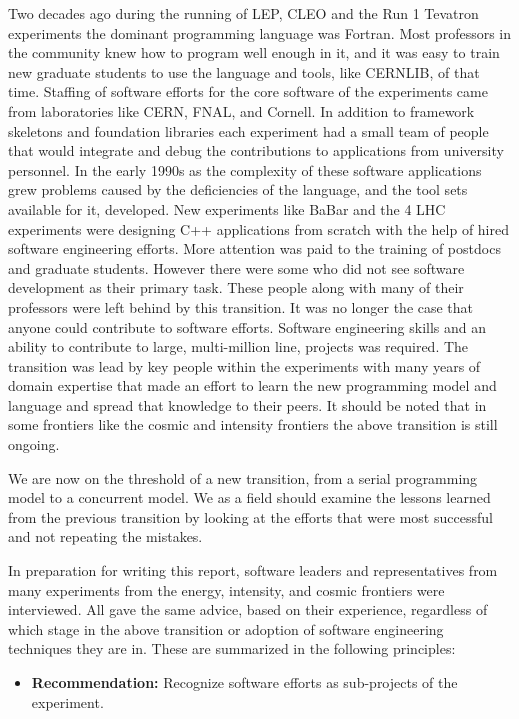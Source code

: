 Two decades ago during the running of LEP, CLEO and the Run 1
Tevatron experiments the dominant programming language was Fortran.
Most professors in the community knew how to program well enough
in it, and it was easy to train new graduate students to use the
language and tools, like CERNLIB, of that time.  Staffing of software
efforts for the core software of the experiments came from laboratories
like CERN, FNAL, and Cornell.  In addition to framework skeletons
and foundation libraries each experiment had a small team of people
that would integrate and debug the contributions to applications
from university personnel. In the early 1990s as the complexity of these
software applications grew problems caused by the deficiencies
 of the language, and the tool sets 
available for it, developed. 
New experiments like BaBar and the 4 LHC experiments were
designing C++ applications from scratch with the help of hired
software engineering efforts. More attention was paid to the training
of postdocs and graduate students. However there were some who did
not see software development as their primary task.  These people
along with many of their professors were left behind by this
transition.  It was no longer the case that anyone could contribute
to software efforts. Software engineering skills and an ability to
contribute to large, multi-million line, projects was required. The
transition was lead by key people within the experiments with many
years of domain expertise that made an effort to learn the new
programming model and language and spread that knowledge to their
peers. It should be noted that in some frontiers like the cosmic
and intensity frontiers the above transition is still ongoing.

We are now on the threshold of a new transition, from a serial
programming model to a concurrent model. We as a field should examine
the lessons learned from the previous transition by looking at the
efforts that were most successful and not repeating the mistakes.

In preparation for writing this report, software leaders and
representatives from many experiments from the energy, intensity,
and cosmic frontiers were interviewed.  All gave the same advice, based 
on their experience, regardless of which stage in the above transition or 
adoption of software engineering techniques they are in. These are 
summarized in the following principles:

\begin{itemize}
\item[] {\bf Recommendation:} Recognize software efforts as sub-projects of the experiment.  
\end{itemize}

